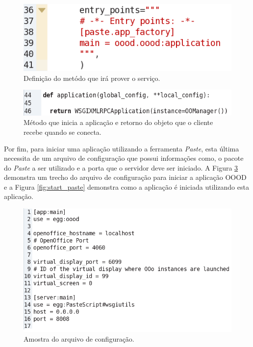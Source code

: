 \begin{figure}[!ht]
\centering
\begin{center}
\includegraphics[scale=0.620,bb=0 30 310 100]{setup_py_paste.png}
\end{center}
\caption{Definição do metódo que irá prover o serviço.}
\label{fig:setup}
\end{figure}

\begin{figure}[!ht]
\centering
\begin{center}
\includegraphics[scale=0.620,bb=0 30 510 60]{oood_application.png}
\end{center}
\caption{Método que inicia a aplicação e retorno do objeto que o cliente recebe quando se conecta.}
\label{fig:application}
\end{figure}

Por fim, para iniciar uma aplicação utilizando a ferramenta \textit{Paste}, esta última necessita de um arquivo de configuração que possui informações como, o pacote do \textit{Paste} a ser utilizado e a porta que o servidor deve ser iniciado. A Figura \ref{fig:oood_conf} demonstra um trecho do arquivo de configuração para iniciar a aplicação OOOD e a Figura \ref{fig:start_paste} demonstra como a aplicação é iniciada utilizando esta aplicação.

\begin{figure}[!ht]
\centering
\begin{center}
\includegraphics[scale=0.520,bb=0 30 510 280]{oood_conf.png}
\end{center}
\caption{Amostra do arquivo de configuração.}
\label{fig:oood_conf}
\end{figure}

